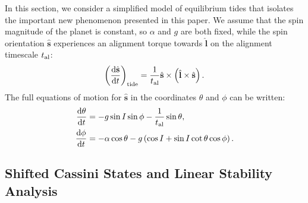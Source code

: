\documentclass[
        fleqn,
        usenatbib,
    ]{mnras}
\newcommand*{\rd}[2]{\frac{\mathrm{d}#1}{\mathrm{d}#2}}
\newcommand*{\p}[1]{\left(#1\right)}
\newcommand*{\uv}[1]{\hat{\mathbf{#1}}}
\begin{document}
In this section, we consider a simplified model of equilibrium tides that
isolates the important new phenomenon presented in this paper. We assume that
the spin magnitude of the planet is constant, so $\alpha$ and $g$ are both
fixed, while the spin orientation $\uv{s}$ experiences an alignment torque
towards $\uv{l}$ on the alignment timescale $t_{\rm al}$:
\begin{equation}
    \p{\rd{\uv{s}}{t}}_{\rm tide}
        = \frac{1}{t_{\rm al}} \uv{s} \times \p{\uv{l} \times \uv{s}}.
        \label{eq:dsdt_tide_toy}
\end{equation}
The full equations of motion for $\uv{s}$ in the coordinates $\theta$ and $\phi$
can be written:
\begin{align}
    \rd{\theta}{t} &= -g\sin I \sin \phi - \frac{1}{t_{\rm al}} \sin \theta,
        \label{eq:dqdt_toy}\\
    \rd{\phi}{t} &= -\alpha \cos\theta
        - g\p{\cos I + \sin I \cot \theta \cos \phi}.\label{eq:dfdt_toy}
\end{align}

\subsection{Shifted Cassini States and Linear Stability
Analysis}\label{ss:tidal_equils}
\end{document}
